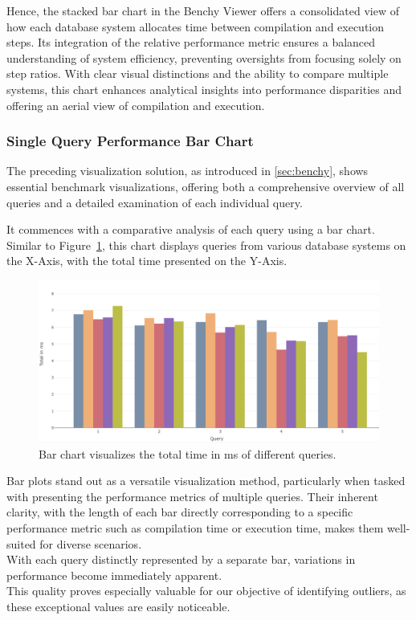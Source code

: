 Hence, the stacked bar chart in the Benchy Viewer offers a consolidated view of how each database system allocates time between compilation and execution steps. Its integration of the relative performance metric ensures a balanced understanding of system efficiency, preventing oversights from focusing solely on step ratios. With clear visual distinctions and the ability to compare multiple systems, this chart enhances analytical insights into performance disparities and offering an aerial view of compilation and execution.


\subsubsection{Single Query Performance Bar Chart}

The preceding visualization solution, as introduced in \ref*{sec:benchy}, shows essential benchmark visualizations, offering both a comprehensive overview of all queries and a detailed examination of each individual query.

It commences with a comparative analysis of each query using a bar chart. Similar to Figure~\ref{fig:bar-chart}, this chart displays queries from various database systems on the X-Axis, with the total time presented on the Y-Axis. 

\begin{figure}[h]
    \centering
    \includegraphics[width=1\linewidth]{figures/bsp-bar.png}
    \caption{Bar chart visualizes the total time in ms of different queries.}
    \label{fig:bar-chart}
  \end{figure}

Bar plots stand out as a versatile visualization method, particularly when tasked with presenting the performance metrics of multiple queries. Their inherent clarity, with the length of each bar directly corresponding to a specific performance metric such as compilation time or execution time, makes them well-suited for diverse scenarios.\\
With each query distinctly represented by a separate bar, variations in performance become immediately apparent.\\
This quality proves especially valuable for our objective of identifying outliers, as these exceptional values are easily noticeable.


